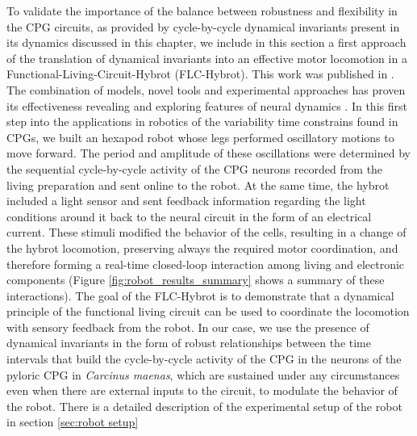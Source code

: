 To validate the importance of the balance between robustness and flexibility in the CPG circuits, as provided by cycle-by-cycle dynamical invariants present in its dynamics discussed in this chapter, we include in this section a first approach of the translation of dynamical invariants into an effective motor locomotion in a Functional-Living-Circuit-Hybrot (FLC-Hybrot). This work was published in \textcite{amaducci_hybrid_2020,amaducci_controlling_2021,soetard_dynamical_2023}. The combination of models, novel tools and experimental approaches has proven its effectiveness revealing and exploring features of neural dynamics \parencite{szucs_interacting_2000,chamorro_generalization_2012,reyes-sanchez_automatized_2023}. In this first step into the applications in robotics of the variability time constrains found in CPGs, we built an hexapod robot whose legs performed oscillatory motions to move forward. The period and amplitude of these oscillations were determined by the sequential cycle-by-cycle activity of the CPG neurons recorded from the living preparation and sent online to the robot. At the same time, the hybrot included a light sensor and sent feedback information regarding the light conditions around it back to the neural circuit in the form of an electrical current. These stimuli modified the behavior of the cells, resulting in a change of the hybrot locomotion, preserving always the required motor coordination, and therefore forming a real-time closed-loop interaction among living and electronic components (Figure \ref{fig:robot_results_summary} shows a summary of these interactions). The goal of the FLC-Hybrot is to demonstrate that a dynamical principle of the functional living circuit can be used to coordinate the locomotion with sensory feedback from the robot. In our case, we use the presence of dynamical invariants in the form of robust relationships between the time intervals that build the cycle-by-cycle activity of the CPG in the neurons of the pyloric CPG in \textit{Carcinus maenas}, which are sustained under any circumstances even when there are external inputs to the circuit, to modulate the behavior of the robot. There is a detailed description of the experimental setup of the robot in section \ref{sec:robot setup}

